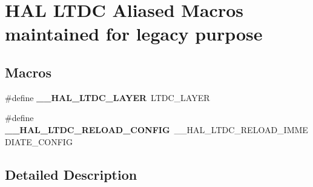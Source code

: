 \hypertarget{group___h_a_l___l_t_d_c___aliased___macros}{}\section{H\+AL L\+T\+DC Aliased Macros maintained for legacy purpose}
\label{group___h_a_l___l_t_d_c___aliased___macros}
\subsection*{Macros}
\begin{DoxyCompactItemize}
\item 
\mbox{\label{group___h_a_l___l_t_d_c___aliased___macros_ga3bd298a3cccf42ab68193701d93fb16d}} 
\#define {\bfseries \+\_\+\+\_\+\+H\+A\+L\+\_\+\+L\+T\+D\+C\+\_\+\+L\+A\+Y\+ER}~L\+T\+D\+C\+\_\+\+L\+A\+Y\+ER
\item 
\mbox{\label{group___h_a_l___l_t_d_c___aliased___macros_gabe568494404d4d1f614294966649a20a}} 
\#define {\bfseries \+\_\+\+\_\+\+H\+A\+L\+\_\+\+L\+T\+D\+C\+\_\+\+R\+E\+L\+O\+A\+D\+\_\+\+C\+O\+N\+F\+IG}~\+\_\+\+\_\+\+H\+A\+L\+\_\+\+L\+T\+D\+C\+\_\+\+R\+E\+L\+O\+A\+D\+\_\+\+I\+M\+M\+E\+D\+I\+A\+T\+E\+\_\+\+C\+O\+N\+F\+IG
\end{DoxyCompactItemize}


\subsection{Detailed Description}
